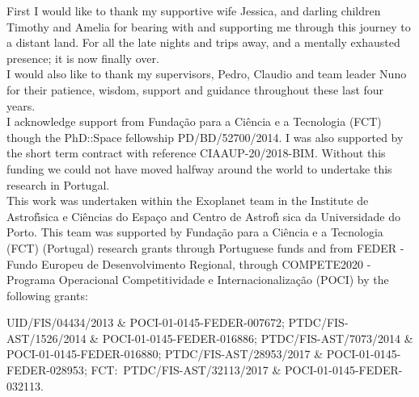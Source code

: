 
\begin{acknowledgements}
    \label{preface:acknowledgements}
    First I would like to thank my supportive wife Jessica, and darling children Timothy and Amelia for bearing with and supporting me through this journey to a distant land.
    For all the late nights and trips away, and a mentally exhausted presence; it is now finally over.\\
    
    I would also like to thank my supervisors, Pedro, Claudio and team leader Nuno for their patience, wisdom, support and guidance throughout these last four years.\\
    
    I acknowledge support from Funda\c{c}\~{a}o para a Ci\^encia e a Tecnologia (FCT) though the PhD::Space fellowship {PD/BD/52700/2014}.
    I was also supported by the short term contract with reference {CIAAUP-20/2018-BIM}.
    Without this funding we could not have moved halfway around the world to undertake this research in Portugal.\\
    
    This work was undertaken within the Exoplanet team in the Institute de Astrof\'{\i}sica e Ci\^encias do Espa\c{c}o and Centro de Astrof\'{\i} sica da Universidade do Porto.
    This team was supported by Funda\c{c}\~ao para a Ci\^{e}ncia e a Tecnologia (FCT) (Portugal) research grants through Portuguese funds and from {FEDER} - Fundo Europeu de Desenvolvimento Regional, through {COMPETE2020} - Programa Operacional Competitividade e Internacionaliza\c{c}\~{a}o ({POCI}) by the following grants:

    {UID/FIS/04434/2013} \& {POCI-01-0145-FEDER-007672};
    {PTDC/FIS-AST/1526/2014} \& {POCI-01-0145-FEDER-016886};
    {PTDC/FIS-AST/7073/2014} \& {POCI-01-0145-FEDER-016880};
    {PTDC/FIS-AST/28953/2017} \& {POCI-01-0145-FEDER-028953};
    {FCT:~PTDC/FIS-AST/32113/2017} \& {POCI-01-0145-FEDER-032113}.

\end{acknowledgements}
